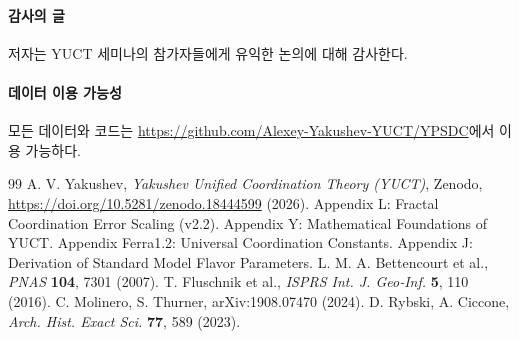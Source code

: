 \documentclass[11pt,a4paper]{article}
\theoremstyle{remark}
\begin{document}
	\paragraph*{감사의 글}
	저자는 YUCT 세미나의 참가자들에게 유익한 논의에 대해 감사한다.
	
	\paragraph*{데이터 이용 가능성}
	모든 데이터와 코드는 \url{https://github.com/Alexey-Yakushev-YUCT/YPSDC}에서 이용 가능하다.
	
	\begin{thebibliography}{99}
		 A. V. Yakushev, \emph{Yakushev Unified Coordination Theory (YUCT)}, Zenodo, \url{https://doi.org/10.5281/zenodo.18444599} (2026).
		 Appendix L: Fractal Coordination Error Scaling (v2.2).
		 Appendix Y: Mathematical Foundations of YUCT.
		 Appendix Ferra1.2: Universal Coordination Constants.
		 Appendix J: Derivation of Standard Model Flavor Parameters.
		 L. M. A. Bettencourt et al., \emph{PNAS} \textbf{104}, 7301 (2007).
		 T. Fluschnik et al., \emph{ISPRS Int. J. Geo‑Inf.} \textbf{5}, 110 (2016).
		 C. Molinero, S. Thurner, arXiv:1908.07470 (2024).
		 D. Rybski, A. Ciccone, \emph{Arch. Hist. Exact Sci.} \textbf{77}, 589 (2023).
	\end{thebibliography}
	
\end{document}

